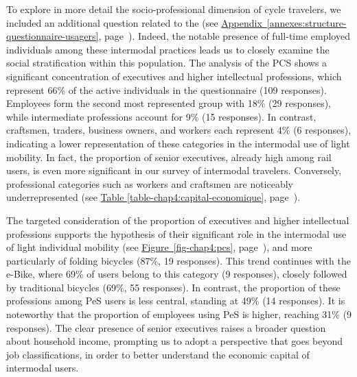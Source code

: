 \begin{refsegment}
To explore in more detail the socio-professional dimension of cycle travelers, we included an additional question related to the  (see \hyperref[annexes:structure-questionnaire-usagers]{Appendix~\ref{annexes:structure-questionnaire-usagers}}, page~\pageref{annexes:structure-questionnaire-usagers}). Indeed, the notable presence of full-time employed individuals among these intermodal practices leads us to closely examine the social stratification within this population. The analysis of the \acrshort{PCS} shows a significant concentration of executives and higher intellectual professions, which represent 66\% of the active individuals in the questionnaire (109 responses). Employees form the second most represented group with 18\% (29 responses), while intermediate professions account for 9\% (15 responses). In contrast, craftsmen, traders, business owners, and workers each represent 4\% (6 responses), indicating a lower representation of these categories in the intermodal use of light mobility. In fact, the proportion of senior executives, already high among rail users, is even more significant in our survey of intermodal travelers. Conversely, professional categories such as workers and craftsmen are noticeably underrepresented (see \hyperref[table-chap4:capital-economique]{Table \ref{table-chap4:capital-economique}}, page~\pageref{table-chap4:capital-economique}).%

The targeted consideration of the proportion of executives and higher intellectual professions supports the hypothesis of their significant role in the intermodal use of light individual mobility (see \hyperref[fig-chap4:pcs]{Figure~\ref{fig-chap4:pcs}}, page~\pageref{fig-chap4:pcs}), and more particularly of folding bicycles (87\%, 19 responses). This trend continues with the \acrshort{e-Bike}, where 69\% of users belong to this category (9 responses), closely followed by traditional bicycles (69\%, 55 responses). In contrast, the proportion of these professions among \acrshort{PeS} users is less central, standing at 49\% (14 responses). It is noteworthy that the proportion of employees using \acrshort{PeS} is higher, reaching 31\% (9 responses). The clear presence of senior executives raises a broader question about household income, prompting us to adopt a perspective that goes beyond job classifications, in order to better understand the economic capital of intermodal users.%


\end{refsegment}
